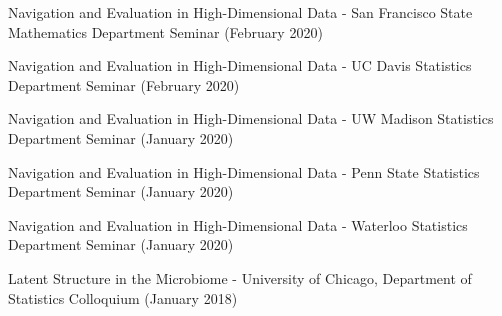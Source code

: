 \documentclass[letterpaper]{article}
\renewenvironment{itemize}{
  \begin{list}{}{
    \setlength{\leftmargin}{1.5em}
  }
}{
  \end{list}
}
\begin{document}
\begin{itemize}
  \item Navigation and Evaluation in High-Dimensional Data - San Francisco State Mathematics Department Seminar (February 2020)
  \item Navigation and Evaluation in High-Dimensional Data - UC Davis Statistics Department Seminar (February 2020)
  \item Navigation and Evaluation in High-Dimensional Data - UW Madison Statistics Department Seminar (January 2020)
  \item Navigation and Evaluation in High-Dimensional Data - Penn State Statistics Department Seminar (January 2020)
  \item Navigation and Evaluation in High-Dimensional Data - Waterloo Statistics Department Seminar (January 2020)
  \item Latent Structure in the Microbiome - University of Chicago, Department of Statistics Colloquium (January 2018)
\end{itemize}
\end{document}
